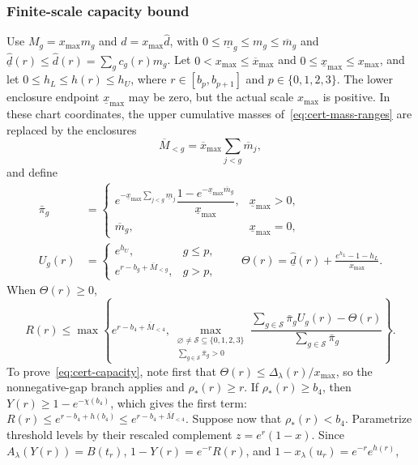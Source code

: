 \documentclass[11pt]{article}
\theoremstyle{definition}
\theoremstyle{remark}
\begin{document}
\subsubsection{Finite-scale capacity bound}
Use $M_g=x_{\max}m_g$ and $d=x_{\max}\hat d$, with
$0\le\underline m_g\le m_g\le\overline m_g$ and
$\underline{\hat d}(r)\le\hat d(r)=\sum_g c_g(r)m_g$.  Let
$0<x_{\max}\le\overline{x}_{\max}$ and
$0\le\underline{x}_{\max}\le x_{\max}$, and let
$0\le h_L\le h(r)\le h_U$, where
$r\in[b_p,b_{p+1}]$ and $p\in\{0,1,2,3\}$.
The lower enclosure endpoint $\underline{x}_{\max}$ may be zero,
but the actual scale $x_{\max}$ is positive.  In these chart coordinates, the upper
cumulative masses of~\eqref{eq:cert-mass-ranges} are replaced by the enclosures
\[
 \overline M_{<g}=\overline{x}_{\max}\sum_{j<g}\overline m_j,
\]
and define
\begin{align*}
 \bar\pi_g&=
 \begin{cases}
 e^{-\underline{x}_{\max}\sum_{j<g}\underline m_j}
 \dfrac{1-e^{-\underline{x}_{\max}\overline m_g}}{\underline{x}_{\max}},
                   &\underline{x}_{\max}>0,\\[2mm]
 \overline m_g,&\underline{x}_{\max}=0,
 \end{cases}\\
 U_g(r)&=\begin{cases}
 e^{h_U},&g\le p,\\e^{r-b_g+\overline M_{<g}},&g>p,
 \end{cases}
 \qquad
 \Theta(r)=\underline{\hat d}(r)
                   +\frac{e^{h_L}-1-h_L}{\overline{x}_{\max}}.
\end{align*}
When $\Theta(r)\ge0$,
\begin{equation}\label{eq:cert-capacity}
 R(r)\le\max\left\{e^{r-b_4+\overline M_{<4}},
 \max_{\substack{\varnothing\ne \mathcal S\subseteq\{0,1,2,3\}\\
                  \sum_{g\in \mathcal S}\bar\pi_g>0}}
 \frac{\sum_{g\in \mathcal S}\bar\pi_gU_g(r)-\Theta(r)}{\sum_{g\in \mathcal S}\bar\pi_g}
 \right\}.
\end{equation}
To prove~\eqref{eq:cert-capacity}, note first that $\Theta(r)\le\Delta_\lambda(r)/x_{\max}$, so
the nonnegative-gap branch applies and $\rho_*(r)\ge r$. If $\rho_*(r)\ge b_4$, then
$Y(r)\ge1-e^{-\chi(b_4)}$, which gives the first term:
$R(r)\le e^{r-b_4+h(b_4)}\le e^{r-b_4+\overline M_{<4}}$. Suppose
now that $\rho_*(r)<b_4$. Parametrize threshold levels by their rescaled complement
$z=e^r(1-x)$. Since $A_\lambda(Y(r))=B(t_r)$, $1-Y(r)=e^{-r}R(r)$, and
$1-x_\lambda(u_r)=e^{-r}e^{h(r)}$,
\end{document}
